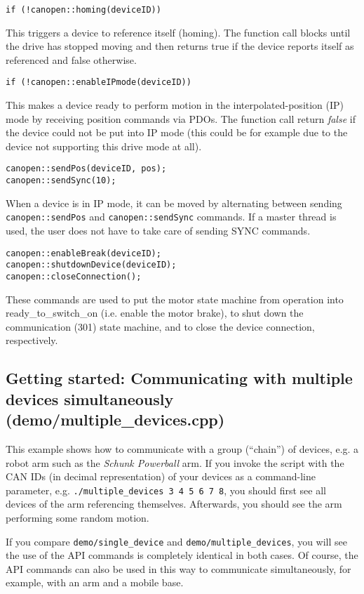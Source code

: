 \begin{verbatim}
if (!canopen::homing(deviceID))
\end{verbatim}
This triggers a device to reference itself (homing). The function call blocks until the drive has stopped moving and then returns true if the device reports itself as referenced and false otherwise.

\begin{verbatim}
if (!canopen::enableIPmode(deviceID))
\end{verbatim}
This makes a device ready to perform motion in the interpolated-position (IP) mode by receiving position commands via PDOs. The function call return {\em false} if the device could not be put into IP mode (this could be for example due to the device not supporting this drive mode at all).

\begin{verbatim}
canopen::sendPos(deviceID, pos);
canopen::sendSync(10);
\end{verbatim}
When a device is in IP mode, it can be moved by alternating between sending \texttt{canopen::sendPos} and \texttt{canopen::sendSync} commands. If a master thread is used, the user does not have to take care of sending SYNC commands.

\begin{verbatim}
canopen::enableBreak(deviceID);
canopen::shutdownDevice(deviceID);
canopen::closeConnection(); 
\end{verbatim}
These commands are used to put the motor state machine from operation into ready\_to\_switch\_on (i.e. enable the motor brake), to shut down the communication (301) state machine, and to close the device connection, respectively.

\subsection{Getting started: Communicating with multiple devices simultaneously (demo/multiple\_devices.cpp)}

This example shows how to communicate with a group (``chain'') of devices, e.g. a robot arm such as the {\em Schunk Powerball} arm. If you invoke the script with the CAN IDs (in decimal representation) of your devices as a command-line parameter, e.g. \texttt{./multiple\_devices 3 4 5 6 7 8}, you should first see all devices of the arm referencing themselves. Afterwards, you should see the arm performing some random motion.

If you compare \texttt{demo/single\_device} and \texttt{demo/multiple\_devices}, you will see the use of the API commands is completely identical in both cases. Of course, the API commands can also be used in this way to communicate simultaneously, for example, with an arm and a mobile base.


